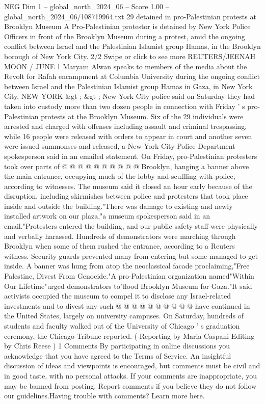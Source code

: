\begin{textsample}{NEG Dim 1 – global\_north\_2024\_06 – Score 1.00 – global\_north\_2024\_06/108719964.txt}  \label{ex:f1_neg_139}
29 detained in pro-Palestinian protests at Brooklyn Museum A Pro-Palestinian protestor is detained by New York Police Officers in front of the Brooklyn Museum during a protest, amid the ongoing conflict between Israel and the Palestinian Islamist group Hamas, in the Brooklyn borough of New York City. 2/2 Swipe or click to see more REUTERS/JEENAH MOON / JUNE 1 Maryam Alwan speaks to members of the media about the Revolt for Rafah encampment at Columbia University during the ongoing conflict between Israel and the Palestinian Islamist group Hamas in Gaza, in New York City.
NEW YORK \&gt ; \&gt ; New York City police said on Saturday they had taken into custody more than two dozen people in connection with Friday ' s pro-Palestinian protests at the Brooklyn Museum.
Six of the 29 individuals were arrested and charged with offenses including assault and criminal trespassing, while 16 people were released with orders to appear in court and another seven were issued summonses and released, a New York City Police Department spokesperson said in an emailed statement.
On Friday, pro-Palestinian protesters took over parts of @ @ @ @ @ @ @ @ @ @ Brooklyn, hanging a banner above the main entrance, occupying much of the lobby and scuffling with police, according to witnesses.
The museum said it closed an hour early because of the disruption, including skirmishes between police and protesters that took place inside and outside the building."There was damage to existing and newly installed artwork on our plaza,"a museum spokesperson said in an email."Protesters entered the building, and our public safety staff were physically and verbally harassed.
Hundreds of demonstrators were marching through Brooklyn when some of them rushed the entrance, according to a Reuters witness.
Security guards prevented many from entering but some managed to get inside.
A banner was hung from atop the neoclassical facade proclaiming,"Free Palestine, Divest From Genocide."A pro-Palestinian organization named"Within Our Lifetime"urged demonstrators to"flood Brooklyn Museum for Gaza."It said activists occupied the museum to compel it to disclose any Israel-related investments and to divest any such @ @ @ @ @ @ @ @ @ @ have continued in the United States, largely on university campuses.
On Saturday, hundreds of students and faculty walked out of the University of Chicago ' s graduation ceremony, the Chicago Tribune reported. ( Reporting by Maria Caspani Editing by Chris Reese ) 1 Comments By participating in online discussions you acknowledge that you have agreed to the Terms of Service.
An insightful discussion of ideas and viewpoints is encouraged, but comments must be civil and in good taste, with no personal attacks.
If your comments are inappropriate, you may be banned from posting.
Report comments if you believe they do not follow our guidelines.Having trouble with comments?
Learn more here.

\end{textsample}
